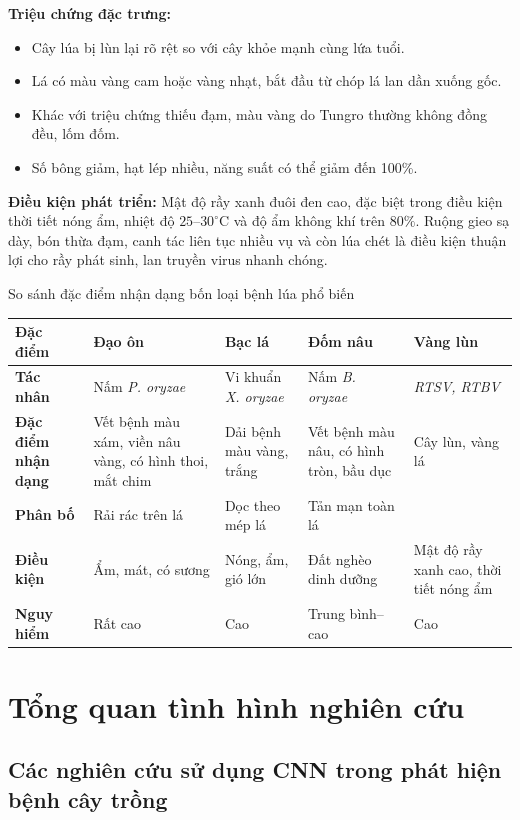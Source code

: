 \textbf{Triệu chứng đặc trưng:}
\begin{itemize}[leftmargin=1.5cm]
    \item Cây lúa bị lùn lại rõ rệt so với cây khỏe mạnh cùng lứa tuổi.
    \item Lá có màu vàng cam hoặc vàng nhạt, bắt đầu từ chóp lá lan dần xuống gốc.
    \item Khác với triệu chứng thiếu đạm, màu vàng do Tungro thường không đồng đều, lốm đốm.
    \item Số bông giảm, hạt lép nhiều, năng suất có thể giảm đến 100\%.
\end{itemize}

\textbf{Điều kiện phát triển:} Mật độ rầy xanh đuôi đen cao, đặc biệt trong điều kiện thời tiết nóng ẩm, nhiệt độ $25$--$30^\circ$C và độ ẩm không khí trên $80\%$. Ruộng gieo sạ dày, bón thừa đạm, canh tác liên tục nhiều vụ và còn lúa chét là điều kiện thuận lợi cho rầy phát sinh, lan truyền virus nhanh chóng.

\begin{table}[H]{So sánh đặc điểm nhận dạng bốn loại bệnh lúa phổ biến}
\centering
\small
\setlength{\tabcolsep}{4pt}
\begin{tabular}{>{\bfseries}p{2.6cm} p{3.2cm} p{3.2cm} p{3.2cm} p{3.2cm}}
\toprule
\textbf{Đặc điểm} & \textbf{Đạo ôn} & \textbf{Bạc lá} & \textbf{Đốm nâu} & \textbf{Vàng lùn} \\
\midrule
Tác nhân & Nấm \textit{P. oryzae} & Vi khuẩn \textit{X. oryzae} & Nấm \textit{B. oryzae} & \textit{RTSV, RTBV}\\[4pt]
Đặc điểm nhận dạng & Vết bệnh màu xám, viền nâu vàng, có hình thoi, mắt chim & Dải bệnh màu vàng, trắng & Vết bệnh màu nâu, có hình tròn, bầu dục & Cây lùn, vàng lá\\[4pt]
Phân bố & Rải rác trên lá & Dọc theo mép lá & Tản mạn toàn lá \\[4pt]
Điều kiện & Ẩm, mát, có sương & Nóng, ẩm, gió lớn & Đất nghèo dinh dưỡng & Mật độ rầy xanh cao, thời tiết nóng ẩm\\[4pt]
Nguy hiểm & Rất cao & Cao & Trung bình--cao & Cao\\
\bottomrule
\end{tabular}
\end{table}

\section{Tổng quan tình hình nghiên cứu}

\subsection{Các nghiên cứu sử dụng CNN trong phát hiện bệnh cây trồng}

